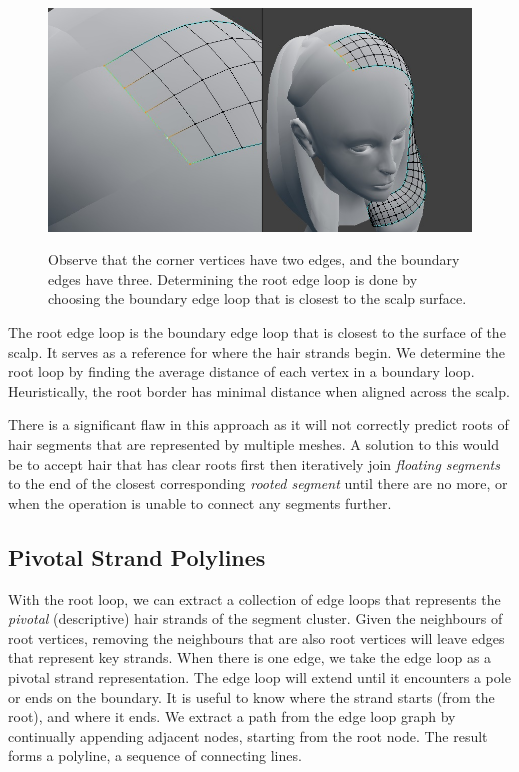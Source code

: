 \documentclass[ %
author={Dillon Keith Diep},
supervisor={Dr. Carl Henrik Ek},
degree={MEng},
title={ART-CG:},
subtitle={Assisted Real-time Content Generation of 3D Hair by Learning Manifolds},
type={Research},
year={2017} ]{dissertation}
\begin{document}
\begin{figure}[!h]
	\centering
	\caption{Observe that the corner vertices have two edges, and the boundary edges have three. Determining the root edge loop is done by choosing the boundary edge loop that is closest to the scalp surface.}
	\includegraphics[scale=0.5]{images/rootLoop}\\
\end{figure}

The root edge loop is the boundary edge loop that is closest to the surface of the scalp. It serves as a reference for where the hair strands begin. We determine the root loop by finding the average distance of each vertex in a boundary loop. Heuristically, the root border has minimal distance when aligned across the scalp.

There is a significant flaw in this approach as it will not correctly predict roots of hair segments that are represented by multiple meshes. A solution to this would be to accept hair that has clear roots first then iteratively join \textit{floating segments} to the end of the closest corresponding \textit{rooted segment} until there are no more, or when the operation is unable to connect any segments further.	

\subsection{Pivotal Strand Polylines}
With the root loop, we can extract a collection of edge loops that represents the \textit{pivotal} (descriptive) hair strands of the segment cluster. Given the neighbours of root vertices, removing the neighbours that are also root vertices will leave edges that represent key strands. When there is one edge, we take the edge loop as a pivotal strand representation. The edge loop will extend until it encounters a pole or ends on the boundary. It is useful to know where the strand starts (from the root), and where it ends. We extract a path from the edge loop graph by continually appending adjacent nodes, starting from the root node. The result forms a polyline, a sequence of connecting lines.
\end{document}
